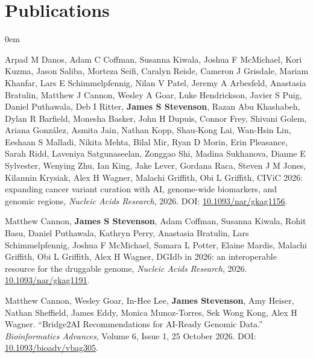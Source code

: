 \documentclass[letterpaper,11pt]{article}
\begin{document}
\section{Publications}
\begin{addmargin}[1em]{0em}

Arpad M Danos, Adam C Coffman, Susanna Kiwala, Joshua F McMichael, Kori Kuzma, Jason Saliba, Morteza Seifi, Caralyn Reisle, Cameron J Grisdale, Mariam Khanfar, Lars E Schimmelpfennig, Nilan V Patel, Jeremy A Arbesfeld, Anastasia Bratulin, Matthew J Cannon, Wesley A Goar, Luke Hendrickson, Javier S Puig, Daniel Puthawala, Deb I Ritter, \textbf{James S Stevenson}, Razan Abu Khashabeh, Dylan R Barfield, Monesha Basker, John H Dupuis, Connor Frey, Shivani Golem, Ariana González, Asmita Jain, Nathan Kopp, Shau-Kong Lai, Wan-Hsin Lin, Eeshaan S Malladi, Nikita Mehta, Bilal Mir, Ryan D Morin, Erin Pleasance, Sarah Ridd, Laveniya Satgunaseelan, Zonggao Shi, Madina Sukhanova, Dianne E Sylvester, Wenying Zhu, Ian King, Jake Lever, Gordana Raca, Steven J M Jones, Kilannin Krysiak, Alex H Wagner, Malachi Griffith, Obi L Griffith, CIViC 2026: expanding cancer variant curation with AI, genome-wide biomarkers, and genomic regions, \emph{Nucleic Acids Research}, 2026. DOI: \href{https://doi.org/10.1093/nar/gkag1156}{10.1093/nar/gkag1156}.


\vspace{8pt}\par

Matthew Cannon, \textbf{James S Stevenson}, Adam Coffman, Susanna Kiwala, Rohit Basu, Daniel Puthawala, Kathryn Perry, Anastasia Bratulin, Lars Schimmelpfennig, Joshua F McMichael, Samara L Potter, Elaine Mardis, Malachi Griffith, Obi L Griffith, Alex H Wagner, DGIdb in 2026: an interoperable resource for the druggable genome, \emph{Nucleic Acids Research}, 2026. \href{https://doi.org/10.1093/nar/gkag1191}{10.1093/nar/gkag1191}.

\vspace{8pt}\par

Matthew Cannon, Wesley Goar, In-Hee Lee, \textbf{James Stevenson}, Amy Heiser, Nathan Sheffield, James Eddy, Monica Munoz-Torres, Sek Wong Kong, Alex H Wagner. ``Bridge2AI Recommendations for AI-Ready Genomic Data.'' \emph{Bioinformatics Advances}, Volume 6, Issue 1, 25 October 2026. DOI: \href{https://doi.org/10.1093/bioadv/vbag305}{10.1093/bioadv/vbag305}.

\vspace{8pt}\par



\end{addmargin}
\end{document}
